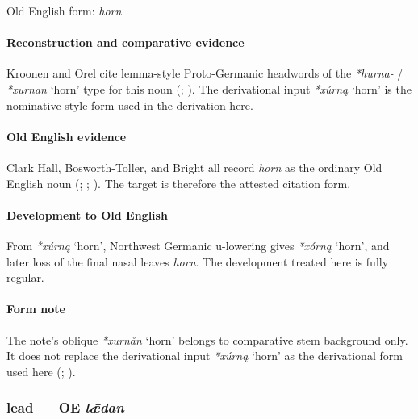 \documentclass[
  british,
  a4paper,
]{article}
\providecommand{\Recon}[1]{\emph{*#1}}
\begin{document}
Old English form: \emph{horn}

\paragraph{Reconstruction and comparative
evidence}\label{reconstruction-and-comparative-evidence-35}

Kroonen and Orel cite lemma-style Proto-Germanic headwords of the
\emph{*hurna-} / \Recon{xurnan} `horn' type for this noun
(; ). The derivational input \Recon{xúrną} `horn' is the
nominative-style form used in the derivation here.

\paragraph{Old English evidence}\label{old-english-evidence-35}

Clark Hall, Bosworth-Toller, and Bright all record \emph{horn} as the
ordinary Old English noun (; ;
). The target is
therefore the attested citation form.

\paragraph{Development to Old
English}\label{development-to-old-english-35}

From \Recon{xúrną} `horn', Northwest Germanic u-lowering gives
\Recon{xórną} `horn', and later loss of the final nasal leaves
\emph{horn}. The development treated here is fully regular.

\paragraph{Form note}\label{form-note-10}

The note's oblique \Recon{xurnăn} `horn' belongs to comparative stem
background only. It does not replace the derivational input
\Recon{xúrną} `horn' as the derivational form used here
(; ).

\subsubsection{\texorpdfstring{lead --- OE
\emph{lǣdan}}{lead --- OE lǣdan}}\label{lead-oe-lux1e3dan}
\end{document}
